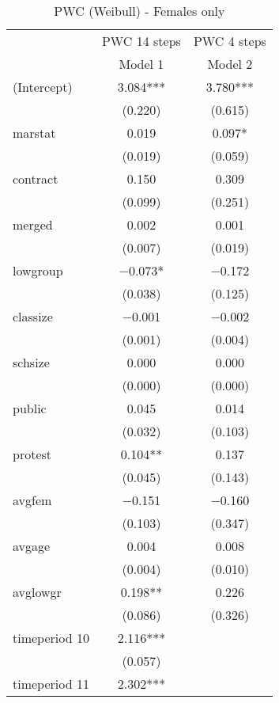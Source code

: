\documentclass[
]{article}
\begin{document}
\begin{table}[!h]

\caption{\label{tab:unnamed-chunk-22}PWC (Weibull) - Females only}
\centering
\fontsize{7}{9}\selectfont
\begin{tabular}[t]{lcc}
\toprule
\multicolumn{1}{c}{ } & \multicolumn{1}{c}{PWC 14 steps} & \multicolumn{1}{c}{PWC 4 steps} \\
\cmidrule(l{3pt}r{3pt}){2-2} \cmidrule(l{3pt}r{3pt}){3-3}
  & Model 1 & Model 2\\
\midrule
(Intercept) & \num{3.084}*** & \num{3.780}***\\
 & (\num{0.220}) & (\num{0.615})\\
marstat & \num{0.019} & \num{0.097}*\\
 & (\num{0.019}) & (\num{0.059})\\
contract & \num{0.150} & \num{0.309}\\
 & (\num{0.099}) & (\num{0.251})\\
merged & \num{0.002} & \num{0.001}\\
 & (\num{0.007}) & (\num{0.019})\\
lowgroup & \num{-0.073}* & \num{-0.172}\\
 & (\num{0.038}) & (\num{0.125})\\
classize & \num{-0.001} & \num{-0.002}\\
 & (\num{0.001}) & (\num{0.004})\\
schsize & \num{0.000} & \num{0.000}\\
 & (\num{0.000}) & (\num{0.000})\\
public & \num{0.045} & \num{0.014}\\
 & (\num{0.032}) & (\num{0.103})\\
protest & \num{0.104}** & \num{0.137}\\
 & (\num{0.045}) & (\num{0.143})\\
avgfem & \num{-0.151} & \num{-0.160}\\
 & (\num{0.103}) & (\num{0.347})\\
avgage & \num{0.004} & \num{0.008}\\
 & (\num{0.004}) & (\num{0.010})\\
avglowgr & \num{0.198}** & \num{0.226}\\
 & (\num{0.086}) & (\num{0.326})\\
timeperiod 10 & \num{2.116}*** & \\
 & (\num{0.057}) & \\
timeperiod 11 & \num{2.302}*** & \\

\end{tabular}
\end{table}
\end{document}

